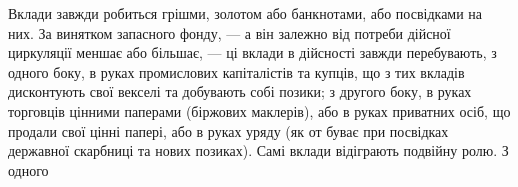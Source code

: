 Вклади завжди робиться грішми, золотом або банкнотами, або посвідками
на них. За винятком запасного фонду, — а він залежно від потреби дійсної циркуляції
меншає або більшає, — ці вклади в дійсності завжди перебувають, з одного
боку, в руках промислових капіталістів та купців, що з тих вкладів дисконтують
свої векселі та добувають собі позики; з другого боку, в руках торговців
цінними паперами (біржових маклерів), або в руках приватних осіб, що продали
свої цінні папері, або в руках уряду (як от буває при посвідках державної
скарбниці та нових позиках). Самі вклади відіграють подвійну ролю. З одного